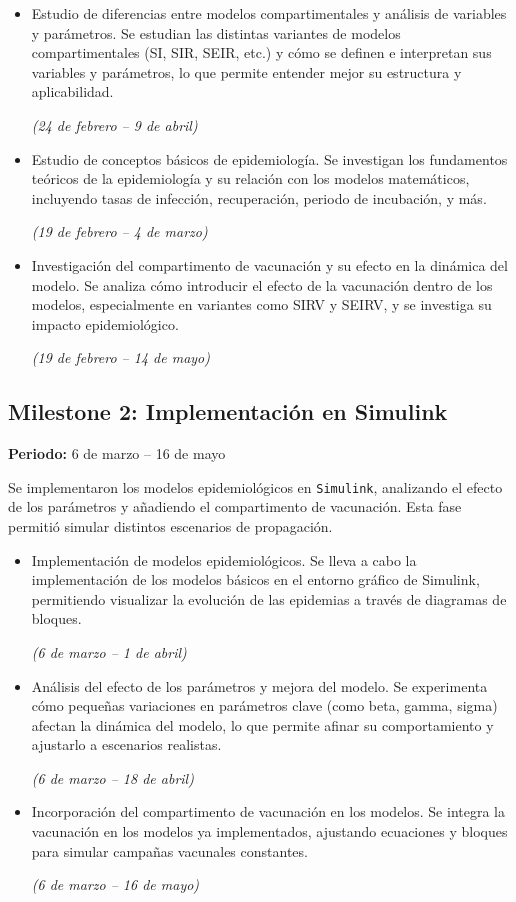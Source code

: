 \begin{itemize}
    \item Estudio de diferencias entre modelos compartimentales y análisis de variables y parámetros. Se estudian las distintas variantes de modelos compartimentales (SI, SIR, SEIR, etc.) y cómo se definen e interpretan sus variables y parámetros, lo que permite entender mejor su estructura y aplicabilidad. 
    
    \textit{(24 de febrero – 9 de abril)}
    \item Estudio de conceptos básicos de epidemiología. Se investigan los fundamentos teóricos de la epidemiología y su relación con los modelos matemáticos, incluyendo tasas de infección, recuperación, periodo de incubación, y más. 
    
    \textit{(19 de febrero – 4 de marzo)}
    \item Investigación del compartimento de vacunación y su efecto en la dinámica del modelo. Se analiza cómo introducir el efecto de la vacunación dentro de los modelos, especialmente en variantes como SIRV y SEIRV, y se investiga su impacto epidemiológico. 
    
    \textit{(19 de febrero – 14 de mayo)}
\end{itemize}

\subsection*{Milestone 2: Implementación en Simulink}
\textbf{Periodo:} 6 de marzo – 16 de mayo

Se implementaron los modelos epidemiológicos en \texttt{Simulink}, analizando el efecto de los parámetros y añadiendo el compartimento de vacunación. Esta fase permitió simular distintos escenarios de propagación.

\begin{itemize}
    \item Implementación de modelos epidemiológicos. Se lleva a cabo la implementación de los modelos básicos en el entorno gráfico de Simulink, permitiendo visualizar la evolución de las epidemias a través de diagramas de bloques. 

    
    \textit{(6 de marzo – 1 de abril)}
    \item Análisis del efecto de los parámetros y mejora del modelo. Se experimenta cómo pequeñas variaciones en parámetros clave (como beta, gamma, sigma) afectan la dinámica del modelo, lo que permite afinar su comportamiento y ajustarlo a escenarios realistas.  
    
    \textit{(6 de marzo – 18 de abril)}
    \item Incorporación del compartimento de vacunación en los modelos. Se integra la vacunación en los modelos ya implementados, ajustando ecuaciones y bloques para simular campañas vacunales constantes.  
    
    \textit{(6 de marzo – 16 de mayo)}
\end{itemize}

